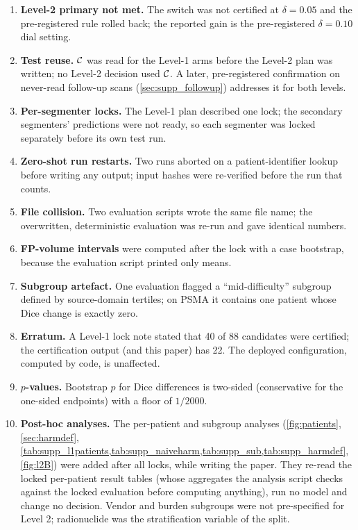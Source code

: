 \begin{enumerate}[nosep,leftmargin=*]
\item \textbf{Level-2 primary not met.} The switch was not certified at $\delta=0.05$ and the pre-registered rule rolled back; the reported gain is the pre-registered $\delta=0.10$ dial setting.
\item \textbf{Test reuse.} $\mathcal{C}$ was read for the Level-1 arms before the Level-2 plan was written; no Level-2 decision used $\mathcal{C}$. A later, pre-registered confirmation on never-read follow-up scans (\cref{sec:supp_followup}) addresses it for both levels.
\item \textbf{Per-segmenter locks.} The Level-1 plan described one lock; the secondary segmenters' predictions were not ready, so each segmenter was locked separately before its own test run.
\item \textbf{Zero-shot run restarts.} Two runs aborted on a patient-identifier lookup before writing any output; input hashes were re-verified before the run that counts.
\item \textbf{File collision.} Two evaluation scripts wrote the same file name; the overwritten, deterministic evaluation was re-run and gave identical numbers.
\item \textbf{FP-volume intervals} were computed after the lock with a case bootstrap, because the evaluation script printed only means.
\item \textbf{Subgroup artefact.} One evaluation flagged a ``mid-difficulty'' subgroup defined by source-domain tertiles; on PSMA it contains one patient whose Dice change is exactly zero.
\item \textbf{Erratum.} A Level-1 lock note stated that 40 of 88 candidates were certified; the certification output (and this paper) has 22. The deployed configuration, computed by code, is unaffected.
\item \textbf{$p$-values.} Bootstrap $p$ for Dice differences is two-sided (conservative for the one-sided endpoints) with a floor of $1/2000$.
\item \textbf{Post-hoc analyses.} The per-patient and subgroup analyses (\cref{fig:patients}, \cref{sec:harmdef}, \cref{tab:supp_l1patients,tab:supp_naiveharm,tab:supp_sub,tab:supp_harmdef}, \cref{fig:l2B}) were added after all locks, while writing the paper. They re-read the locked per-patient result tables (whose aggregates the analysis script checks against the locked evaluation before computing anything), run no model and change no decision. Vendor and burden subgroups were not pre-specified for Level 2; radionuclide was the stratification variable of the split.

\end{enumerate}
